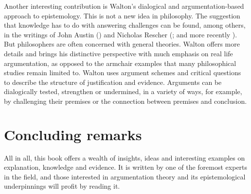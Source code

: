 \documentclass[12pt,a4paper]{article}
\begin{document}
Another interesting contribution is Walton's dialogical and argumentation-based 
approach to epistemology. This is not a new idea in philosophy. The suggestion 
that knowledge has to do with answering challenges can be found, among others,
in the writings of John Austin (\citeyear{austin1962}) and Nicholas Rescher (\citeyear{rescher1977}; and more recently \citeyear{rescher2003,rescher2005}). 
But philosophers are often concerned with general 
theories. Walton offers more details and 
brings his distinctive perspective with much emphasis on real life argumentation, as opposed to the armchair examples that many philosophical studies remain limited to.
Walton uses argument schemes and critical questions
to describe the structure of justification and evidence. 
Arguments can be dialogically tested, strengthen or undermined, 
in a variety of ways, for example, by challenging their premises 
or the connection between premises and conclusion.  


\section{Concluding remarks}

\noindent All in all, this book offers a wealth of
insights, ideas and interesting examples on explanation, knowledge and evidence. It is written by one of the
foremost experts in the field, and those interested in argumentation
theory and its epistemological underpinnings will profit 
by reading it.



\end{document}
